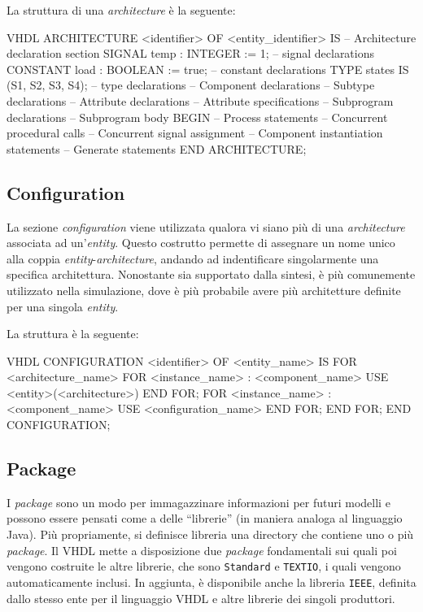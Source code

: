 \documentclass[10pt,a4paper,oneside]{scrbook}
\begin{document}
\pagebreak
La struttura di una \textit{architecture} è la seguente:
\begin{sourcecode}{VHDL}
ARCHITECTURE <identifier> OF <entity_identifier> IS
    -- Architecture declaration section
    SIGNAL temp     : INTEGER := 1;     -- signal declarations
    CONSTANT load   : BOOLEAN := true;  -- constant declarations
    TYPE states IS (S1, S2, S3, S4);    -- type declarations
    -- Component declarations
    -- Subtype declarations
    -- Attribute declarations
    -- Attribute specifications
    -- Subprogram declarations
    -- Subprogram body
BEGIN
    -- Process statements
    -- Concurrent procedural calls
    -- Concurrent signal assignment
    -- Component instantiation statements
    -- Generate statements
END ARCHITECTURE;
\end{sourcecode} 

\subsection{Configuration}
La sezione \textit{configuration} viene utilizzata qualora vi siano più di una 
\textit{architecture} associata ad un'\textit{entity}. Questo costrutto 
permette di assegnare un nome unico alla coppia 
\textit{entity}-\textit{architecture}, andando ad indentificare singolarmente 
una specifica architettura.
Nonostante sia supportato dalla sintesi, è più comunemente utilizzato nella 
simulazione, dove è più probabile avere più architetture definite per una 
singola \textit{entity}.

La struttura è la seguente:
\begin{sourcecode}{VHDL}
CONFIGURATION <identifier> OF <entity_name> IS
    FOR <architecture_name>
        FOR <instance_name> : <component_name> USE
            <entity>(<architecture>)
        END FOR;
        FOR <instance_name> : <component_name> USE
            <configuration_name>
        END FOR;
    END FOR;
END CONFIGURATION;
\end{sourcecode}

\subsection{Package}
I \textit{package} sono un modo per immagazzinare informazioni per futuri 
modelli e possono essere pensati come a delle ``librerie'' (in maniera analoga 
al linguaggio Java). Più propriamente, si definisce libreria una directory che 
contiene uno o più \textit{package}.
Il VHDL mette a disposizione due \textit{package} fondamentali sui quali poi 
vengono costruite le altre librerie, che sono \texttt{Standard} e 
\texttt{TEXTIO}, i quali vengono automaticamente inclusi.
In aggiunta, è disponibile anche la libreria \texttt{IEEE}, definita dallo 
stesso ente per il linguaggio VHDL e altre librerie dei singoli produttori.
\end{document}
